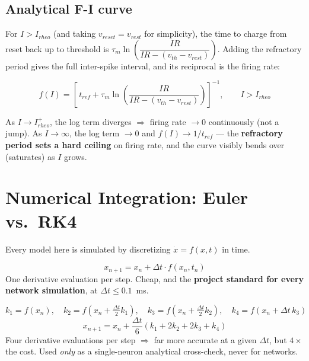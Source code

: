 \documentclass[11pt,a4paper]{article}
\begin{document}
\subsection{Analytical F-I curve}
For $I > I_{rheo}$ (and taking $v_{reset}=v_{rest}$ for simplicity), the time to charge from reset back up to threshold is $\tau_m \ln\!\left(\dfrac{IR}{IR - (v_{th}-v_{rest})}\right)$. Adding the refractory period gives the full inter-spike interval, and its reciprocal is the firing rate:
\begin{eqbox}
$$f(I) = \left[\, t_{ref} + \tau_m \ln\!\left(\frac{IR}{IR - (v_{th}-v_{rest})}\right)\right]^{-1}, \qquad I > I_{rheo}$$
\end{eqbox}

\begin{keybox}
As $I \to I_{rheo}^+$, the log term diverges $\Rightarrow$ firing rate $\to 0$ continuously (not a jump). As $I \to \infty$, the log term $\to 0$ and $f(I) \to 1/t_{ref}$ — the \textbf{refractory period sets a hard ceiling} on firing rate, and the curve visibly bends over (saturates) as $I$ grows.
\end{keybox}

\section{Numerical Integration: Euler vs.\ RK4}
Every model here is simulated by discretizing $\dot x = f(x,t)$ in time.

\begin{eqbox}
$$x_{n+1} = x_n + \Delta t \cdot f(x_n, t_n)$$
One derivative evaluation per step. Cheap, and the \textbf{project standard for every network simulation}, at $\Delta t \le 0.1$~ms.
\end{eqbox}

\begin{eqbox}
$$k_1 = f(x_n),\quad k_2 = f(x_n+\tfrac{\Delta t}{2}k_1),\quad k_3 = f(x_n+\tfrac{\Delta t}{2}k_2),\quad k_4 = f(x_n+\Delta t\,k_3)$$
$$x_{n+1} = x_n + \frac{\Delta t}{6}(k_1 + 2k_2 + 2k_3 + k_4)$$
Four derivative evaluations per step $\Rightarrow$ far more accurate at a given $\Delta t$, but $4\times$ the cost. Used \emph{only} as a single-neuron analytical cross-check, never for networks.
\end{eqbox}
\end{document}
